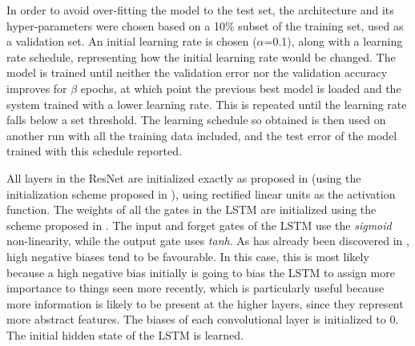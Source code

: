 \documentclass{article}
\begin{document}

In order to avoid over-fitting the model to the test set, the architecture and its hyper-parameters were chosen based on a 10\% subset of the training set, used as a validation set. %
    An initial learning rate is chosen (\(\alpha\)=0.1), along with a learning rate schedule, representing how the initial learning rate would be changed.
    The model is trained until neither the validation error nor the validation accuracy improves for \(\beta\) epochs, at which point the previous best model is loaded and the system trained with a lower learning rate. This is repeated until the learning rate falls below a set threshold.
    The learning schedule so obtained is then used on another run with all the training data included, and the test error of the model trained with this schedule reported.
%


All layers in the ResNet are initialized exactly as proposed in \cite{he2015deep} (using the initialization scheme proposed in \cite{he2015delving}), using rectified linear units as the activation function. The weights of all the gates in the LSTM are initialized using the scheme proposed in \cite{saxe2013exact}. The input and forget gates of the LSTM use the \emph{sigmoid} non-linearity, while the output gate uses \emph{tanh}. As has already been discovered in \cite{srivastava2015training}, high negative biases tend to be favourable. In this case, this is most likely because a high negative bias initially is going to bias the LSTM to assign more importance to things seen more recently, which is particularly useful because more information is likely to be present at the higher layers, since they represent more abstract features. The biases of each convolutional layer is initialized to 0. The initial hidden state of the LSTM is learned.
\end{document}
